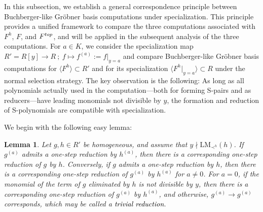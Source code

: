 \documentclass{article}
\newtheorem{lemma}[theorem]{Lemma}
\theoremstyle{definition}
\theoremstyle{plain}
\theoremstyle{plain}
\theoremstyle{plain}
\theoremstyle{plain}
\numberwithin{equation}{subsection}
\begin{document}
In this subsection, we establish a general correspondence principle between Buchberger-like Gr\"obner basis computations under specialization.
This principle provides a unified framework to compare the three computations associated with $F^h$, $F$, and $F^{\rm top}$, and will be applied in the subsequent analysis of the three computations.
For $a\in K$, we consider the specialization map $R'=R[y] \longrightarrow R \ ;\ f \longmapsto f^{(a)}:=f|_{y=a}$ and compare Buchberger-like Gr\"obner basis computations for $\langle F^h\rangle \subset R'$ and for its specialization $\langle F^h|_{y=a}\rangle \subset R$ under the normal selection strategy.
The key observation is the following:
As long as all polynomials actually used in the computation---both for forming S-pairs and as reducers---have leading monomials not divisible by $y$, the formation and reduction of S-polynomials are compatible with specialization.

We begin with the following easy lemma:

\begin{lemma}\label{lm:onestepred}
Let $g,h\in R'$ be homogeneous, and assume that $y\nmid \mathrm{LM}_{\prec^h}(h)$.
If $g^{(a)}$ admits a one-step reduction by $h^{(a)}$, then there is a corresponding one-step reduction of $g$ by $h$. 
Conversely, if $g$ admits a one-step reduction by $h$, then there is a corresponding one-step reduction of $g^{(a)}$ by $h^{(a)}$ for $a\not=0$. 
For $a=0$, if the monomial of the term of $g$ eliminated by $h$ is not divisible by $y$, then there is a corresponding one-step reduction of $g^{(a)}$ by $h^{(a)}$, and otherwise, $g^{(a)}\rightarrow g^{(a)}$ corresponds, which may be called a \textcolor{black}{\em trivial reduction}.
\end{lemma}
\end{document}
